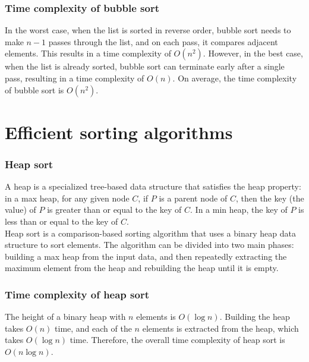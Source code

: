 \documentclass[xcolor=dvipsnames]{beamer}
\begin{document}
    \begin{frame}
        \frametitle{Time complexity of bubble sort}
        In the worst case, when the list is sorted in reverse order, bubble sort needs to make $n-1$ passes through the list, and on each pass, it compares adjacent elements. This results in a time complexity of $O(n^2)$. However, in the best case, when the list is already sorted, bubble sort can terminate early after a single pass, resulting in a time complexity of $O(n)$. On average, the time complexity of bubble sort is $O(n^2)$.\\
    \end{frame}

    \section{Efficient sorting algorithms}
    \begin{frame}
        \frametitle{Heap sort}
        A heap is a specialized tree-based data structure that satisfies the heap property: in a max heap, for any given node $C$, if $P$ is a parent node of $C$, then the key (the value) of $P$ is greater than or equal to the key of $C$. In a min heap, the key of $P$ is less than or equal to the key of $C$.\\
        Heap sort is a comparison-based sorting algorithm that uses a binary heap data structure to sort elements. The algorithm can be divided into two main phases: building a max heap from the input data, and then repeatedly extracting the maximum element from the heap and rebuilding the heap until it is empty.\\
    \end{frame}
    \begin{frame}
        \frametitle{Time complexity of heap sort}
        The height of a binary heap with $n$ elements is $O(\log n)$. Building the heap takes $O(n)$ time, and each of the $n$ elements is extracted from the heap, which takes $O(\log n)$ time. Therefore, the overall time complexity of heap sort is $O(n \log n)$.\\
    \end{frame}
\end{document}
